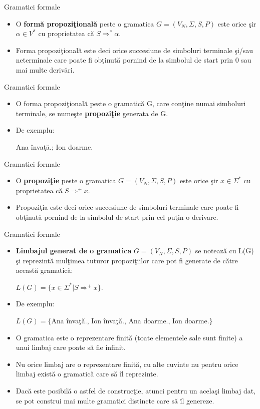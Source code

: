 \documentclass[pdf]{beamer}
\begin{document}
\begin{frame}{Gramatici formale}
\begin{itemize}
\item
O \textbf{formă propoziţională} peste o gramatica $G = (V_{N}, \Sigma, S, P)$ este orice şir $\alpha \in V^{*}$ cu proprietatea că $S \Rightarrow^{*} \alpha$.
\item
Forma propoziţională este deci orice succesiune de simboluri terminale şi/sau neterminale care poate fi obţinută pornind de la simbolul de start prin 0 sau mai multe derivări.
\end{itemize}
\end{frame}

\begin{frame}{Gramatici formale}
\begin{itemize}
\item
O forma propoziţională peste o gramatică G, care conţine numai simboluri terminale, se numeşte \textbf{propoziţie} generata de G.
\item
De exemplu:

Ana învaţă.; Ion doarme.
\end{itemize}
\end{frame}



\begin{frame}{Gramatici formale}
\begin{itemize}
\item
O \textbf{propoziţie} peste o gramatica $G = (V_{N}, \Sigma, S, P)$ este orice şir $x \in \Sigma^{*}$ cu proprietatea că $S \Rightarrow^{+} x$.
\item
Propoziţia este deci orice succesiune de simboluri terminale care poate fi obţinută pornind de la simbolul de start prin cel puţin o derivare.
\end{itemize}
\end{frame}



\begin{frame}{Gramatici formale}
\begin{itemize}
\item
\textbf{Limbajul generat de o gramatica }$G = (V_{N}, \Sigma, S, P)$ se notează cu L(G) şi reprezintă mulţimea tuturor propoziţiilor care pot fi generate de către această gramatică:

$L(G) = \{ x \in \Sigma^{*} | S \Rightarrow^{+} x \}$.
\item
De exemplu:

$L(G) = \{$Ana învaţă., Ion învaţă., Ana doarme., Ion doarme.$\}$
\item
O gramatica este o reprezentare finită (toate elementele sale sunt finite) a unui limbaj care poate să fie infinit. 
\item
Nu orice limbaj are o reprezentare finită, cu alte cuvinte nu pentru orice limbaj există o gramatică care să îl reprezinte. 
\item
Dacă este posibilă o astfel de construcţie, atunci pentru un acelaşi limbaj dat, se pot construi mai multe gramatici distincte care să îl genereze.
\end{itemize}
\end{frame}
\end{document}

